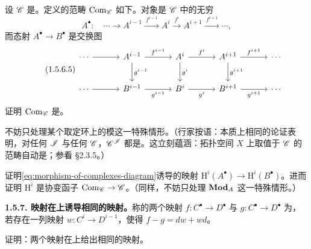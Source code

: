 \begin{exercise}[重要练习]\label{ex:complexes-form-abelian-category}
设 $\mathscr{C}$ 是\trAbelianCategory。定义\trComplexes{}的范畴 $\mathrm{Com}_{\mathscr{C}}$ 如下。对象是 $\mathscr{C}$ 中的无穷\trComplexN
\[
A^{\bullet}\colon\quad\cdots\longrightarrow A^{i-1}\mathrel{\xrightarrow{\ f^{i-1}\ }}A^{i}\mathrel{\xrightarrow{\ f^{i}\ }}A^{i+1}\mathrel{\xrightarrow{\ f^{i+1}\ }}\cdots,
\]
而态射 $A^{\bullet}\to B^{\bullet}$ 是交换图
\begin{equation*}\tag{1.5.6.5}\label{eq:morphism-of-complexes-diagram}
\begin{tikzcd}[row sep=2.3em, column sep=3.2em]
\cdots \ar[r] & A^{i-1} \ar[r,"f^{i-1}"] \ar[d,"g^{i-1}"] & A^{i} \ar[r,"f^{i}"] \ar[d,"g^{i}"] & A^{i+1} \ar[r,"f^{i+1}"] \ar[d,"g^{i+1}"] & \cdots \\
\cdots \ar[r] & B^{i-1} \ar[r,"g^{i-1}"'] & B^{i} \ar[r,"g^{i}"'] & B^{i+1} \ar[r,"g^{i+1}"'] & \cdots
\end{tikzcd}
\end{equation*}
证明 $\mathrm{Com}_{\mathscr{C}}$ 是\trAbelianCategory。

不妨只处理某个取定环上的模这一特殊情形。（行家按语：本质上相同的论证表明，对任何\trSmallCategory{} $\mathscr{I}$ 与任何\trAbelianCategory{} $\mathscr{C}$，$\mathscr{C}^{\mathscr{I}}$ 都是\trAbelianCategory。这立刻蕴涵：拓扑空间 $X$ 上取值于\trAbelianCategory{} $\mathscr{C}$ 的\trPresheaf{}范畴自动是\trAbelianCategory；参看 \S2.3.5。）
\end{exercise}

\begin{exercise}[重要练习]\label{ex:cohomology-functor-on-complexes}
证明\eqref{eq:morphism-of-complexes-diagram}诱导\trHomology{}的映射 $\mathrm{H}^{i}(A^{\bullet})\to\mathrm{H}^{i}(B^{\bullet})$。进而证明 $\mathrm{H}^{i}$ 是协变函子 $\mathrm{Com}_{\mathscr{C}}\to\mathscr{C}$。（同样，不妨只处理 $\mathbf{Mod}_{A}$ 这一特殊情形。）
\end{exercise}

\textbf{1.5.7. \trHomotopic{}映射在\trHomology{}上诱导相同的映射。}\quad 称\trComplexes{}的两个映射 $f\colon C^{\bullet}\to D^{\bullet}$ 与 $g\colon C^{\bullet}\to D^{\bullet}$ 为\trHomotopic，若存在一列映射 $w\colon C^{i}\to D^{i-1}$，使得 $f-g=dw+wd$。

\begin{exercise}\label{ex:homotopic-maps-same-homology}
证明：两个\trHomotopic{}映射在\trHomology{}上给出相同的映射。
\end{exercise}

